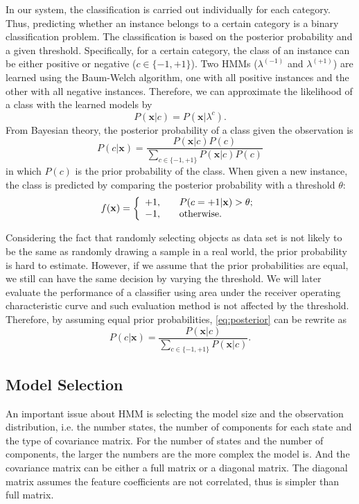 \documentclass[12pt,final,twoside]{report}
\begin{document}
In our system, the classification is carried out individually for each category. Thus, predicting whether an instance belongs to a certain category is a binary classification problem. The classification is based on the posterior probability and a given threshold. Specifically, for a certain category, the class of an instance can be either positive or negative ($c \in \{-1,+1\}$). Two HMMs ($\lambda^{(-1)}$ and $\lambda^{(+1)}$) are learned using the Baum-Welch algorithm, one with all positive instances and the other with all negative instances. Therefore, we can approximate the likelihood of a class with the learned models by
\begin{equation}
  P(\mathbf{x}|c) = P(\mathbf{x}|\lambda^c) .
\end{equation}
From Bayesian theory, the posterior probability of a class given the observation is
\begin{equation} \label{eq:posterior}
  P(c|\mathbf{x}) = \frac{P(\mathbf{x}|c)P(c)}{\sum_{c \in \{-1,+1\}} P(\mathbf{x}|c)P(c)}
\end{equation}
in which $P(c)$ is the prior probability of the class. When given a new instance, the class is predicted by comparing the posterior probability with a threshold $\theta$:
\begin{equation}
  \label{eq:classif}
  f(\mathbf{x}) = \left\{
  \begin{array}{l l}
    +1, & \quad P(c=+1|\mathbf{x}) > \theta; \\
    -1, & \quad \text{otherwise.}
  \end{array} \right.
\end{equation}

Considering the fact that randomly selecting objects as data set is not likely to be the same as randomly drawing a sample in a real world, the prior probability is hard to estimate. However, if we assume that the prior probabilities are equal, we still can have the same decision by varying the threshold. We will later evaluate the performance of a classifier using area under the receiver operating characteristic curve and such evaluation method is not affected by the threshold. Therefore, by assuming equal prior probabilities, \cref{eq:posterior} can be rewrite as 
\begin{equation}
  \label{eq:postsimp}
  P(c|\mathbf{x}) = \frac{P(\mathbf{x}|c)}{\sum_{c \in \{-1,+1\}} P(\mathbf{x}|c)} .
\end{equation}

\subsection{Model Selection}
An important issue about HMM is selecting the model size and the observation distribution, i.e. the number states, the number of components for each state and the type of covariance matrix. For the number of states and the number of components, the larger the numbers are the more complex the model is. And the covariance matrix can be either a full matrix or a diagonal matrix. The diagonal matrix assumes the feature coefficients are not correlated, thus is simpler than full matrix.
\end{document}
